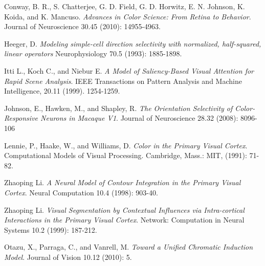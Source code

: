 \documentclass[journal,onecolumn]{IEEEtran}
\begin{document}

%
%
%
\begin{thebibliography}{1}

    Conway, B. R., S. Chatterjee, G. D. Field, G. D. Horwitz, E. N. Johnson, K. Koida, and K. Mancuso.
    \emph{Advances in Color Science: From Retina to Behavior}.
    Journal of Neuroscience 30.45 (2010): 14955-4963.

    Heeger, D.
    \emph{Modeling simple-cell direction selectivity with normalized, half-squared, linear operators}
    Neurophysiology 70.5 (1993): 1885-1898.

    Itti L., Koch C., and Niebur E.
    \emph{A Model of Saliency-Based Visual Attention for Rapid Scene Analysis}.
    IEEE Transactions on Pattern Analysis and Machine Intelligence, 20.11 (1999). 1254-1259.

    Johnson, E., Hawken, M., and Shapley, R.
    \emph{The Orientation Selectivity of Color-Responsive Neurons in Macaque V1}.
    Journal of Neuroscience 28.32 (2008): 8096-106

    Lennie, P., Haake, W., and Williams, D.
    \emph{Color in the Primary Visual Cortex}.
    Computational Models of Visual Processing.
    Cambridge, Mass.: MIT, (1991): 71-82.

  Zhaoping Li.
  \emph{A Neural Model of Contour Integration in the Primary Visual Cortex}.
  Neural Computation 10.4 (1998): 903-40.

  Zhaoping Li.
  \emph{Visual Segmentation by Contextual Influences via Intra-cortical Interactions in the Primary Visual Cortex}.
  Network: Computation in Neural Systems 10.2 (1999): 187-212.

    Otazu, X., Parraga, C., and Vanrell, M.
    \emph{Toward a Unified Chromatic Induction Model}.
    Journal of Vision 10.12 (2010): 5.


\end{thebibliography}
\end{document}
